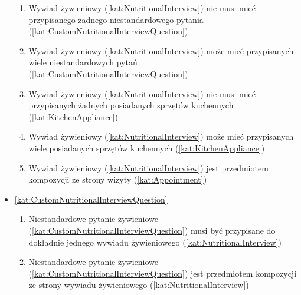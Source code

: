 \begin{itemize}[label={\textbf{Reguły dla}}, wide, labelwidth=!, labelindent=0pt]
\begin{enumerate}[label={\textbf{REG/\protect\threedigits{\arabic{enumi}}}}, wide, labelwidth=!, align=left, leftmargin=3cm, resume]
        \item Wywiad żywieniowy (\ref{kat:NutritionalInterview}) nie musi mieć przypisanego żadnego niestandardowego pytania (\ref{kat:CustomNutritionalInterviewQuestion})
        \item Wywiad żywieniowy (\ref{kat:NutritionalInterview}) może mieć przypisanych wiele niestandardowych pytań (\ref{kat:CustomNutritionalInterviewQuestion})
        \item Wywiad żywieniowy (\ref{kat:NutritionalInterview}) nie musi mieć przypisanych żadnych posiadanych sprzętów kuchennych (\ref{kat:KitchenAppliance})
        \item Wywiad żywieniowy (\ref{kat:NutritionalInterview}) może mieć przypisanych wiele posiadanych sprzętów kuchennych (\ref{kat:KitchenAppliance})
        \item Wywiad żywieniowy (\ref{kat:NutritionalInterview}) jest przedmiotem kompozycji ze strony wizyty (\ref{kat:Appointment})
    \end{enumerate}
    \item\ref{kat:CustomNutritionalInterviewQuestion}
    \begin{enumerate}[label={\textbf{REG/\protect\threedigits{\arabic{enumi}}}}, wide, labelwidth=!, align=left, leftmargin=3cm, resume]
        \item Niestandardowe pytanie żywieniowe (\ref{kat:CustomNutritionalInterviewQuestion}) musi być przypisane do dokładnie jednego wywiadu żywieniowego (\ref{kat:NutritionalInterview})
        \item  Niestandardowe pytanie żywieniowe (\ref{kat:CustomNutritionalInterviewQuestion}) jest przedmiotem kompozycji ze strony wywiadu żywieniowego (\ref{kat:NutritionalInterview})
    \end{enumerate}

\end{itemize}
